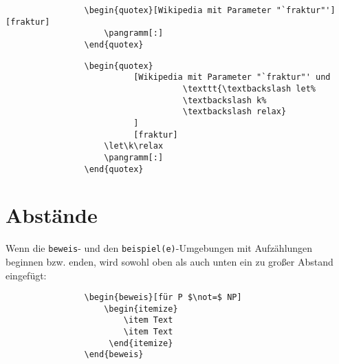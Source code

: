 			\begin{verbatim}
				\begin{quotex}[Wikipedia mit Parameter "`fraktur"'][fraktur]
				    \pangramm[:]
				\end{quotex}
			\end{verbatim}
			
			
			\begin{verbatim}
				\begin{quotex}
				          [Wikipedia mit Parameter "`fraktur"' und 
					                \texttt{\textbackslash let%
					                \textbackslash k%
					                \textbackslash relax}
					      ]
				          [fraktur]
				    \let\k\relax
				    \pangramm[:]
				\end{quotex}
			\end{verbatim}
			
			
		\newpage
		\section{Abstände}
			\label{abstaende beweis beispiel}
			Wenn die \texttt{beweis}- und den \texttt{beispiel(e)}-Umgebungen mit Aufzählungen beginnen bzw. enden, wird sowohl oben als auch unten ein zu großer Abstand eingefügt:
			
			\begin{verbatim}
				\begin{beweis}[für P $\not=$ NP]
				    \begin{itemize} 
				        \item Text 
				        \item Text 
				     \end{itemize}
				\end{beweis}
			\end{verbatim}
			
